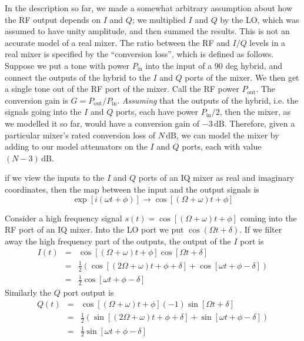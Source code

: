 
In the description so far, we made a somewhat arbitrary assumption about how the RF output depends on $I$ and $Q$; we multiplied $I$ and $Q$ by the LO, which was assumed to have unity amplitude, and then summed the results.
This is not an accurate model of a real mixer.
The ratio between the RF and $I/Q$ levels in a real mixer is specified by the ``conversion loss'', which is defined as follows.
Suppose we put a tone with power $P_\text{in}$ into the input of a 90 deg hybrid, and connect the outputs of the hybrid to the $I$ and $Q$ ports of the mixer.
We then get a single tone out of the RF port of the mixer.
Call the RF power $P_\text{out}$.
The conversion gain is $G = P_\text{out}/P_\text{in}$.
\emph{Assuming} that the outputs of the hybrid, i.e. the signals going into the $I$ and $Q$ ports, each have power $P_\text{in}/2$, then the mixer, as we modelled it so far, would have a conversion gain of $-3\,\text{dB}$.
Therefore, given a particular mixer's rated conversion loss of $N\,\text{dB}$, we can model the mixer by adding to our model attenuators on the $I$ and $Q$ ports, each with value $(N-3) \, \text{dB}$.

if we view the inputs to the $I$ and $Q$ ports of an IQ mixer as real and imaginary coordinates, then the map between the input and the output signals is \begin{equation}
\exp[i(\omega t + \phi)] \rightarrow \cos[(\Omega+\omega)t + \phi] \end{equation}


Consider a high frequency signal $s(t) = \cos [ (\Omega+\omega)t + \phi ]$ coming into the RF port of an IQ mixer. Into the LO port we put $\cos(\Omega t + \delta)$. If we filter away the high frequency part of the outputs, the output of the $I$ port is \begin{eqnarray}
I(t) &=& \cos [ (\Omega + \omega)t + \phi ]\cos [ \Omega t + \delta ] \nonumber \\
&=& \frac{1}{2}\left( \cos [(2\Omega + \omega)t + \phi + \delta ] + \cos [ \omega t + \phi - \delta ] \right) \nonumber \\
&=& \frac{1}{2} \cos [ \omega t + \phi - \delta ] \end{eqnarray}
Similarly the $Q$ port output is \begin{eqnarray}
Q(t) &=& \cos [ (\Omega + \omega)t + \phi ](-1)\sin [ \Omega t + \delta ] \nonumber \\
&=& \frac{1}{2}\left( \sin [(2\Omega + \omega)t + \phi + \delta ] + \sin [ \omega t + \phi - \delta ] \right) \nonumber \\
&=& \frac{1}{2} \sin [ \omega t + \phi - \delta ] \end{eqnarray}

